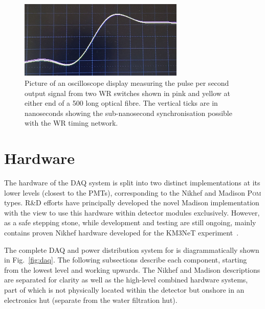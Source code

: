 \begin{figure} %
    \includegraphics[width=0.7\textwidth]{diagrams/5-daq/sync.pdf}
    \caption[Picture of White Rabbit timing synchronisation seen in \chips.]
    {Picture of an oscilloscope display measuring the pulse per second output signal from two WR
        switches shown in pink and yellow at either end of a \unit{500}{} long optical
        fibre. The vertical ticks are in nanoseconds showing the sub-nanosecond synchronisation
        possible with the WR timing network.}
    \label{fig:sync}
\end{figure}

\section{Hardware} %
\label{sec:daq_hard} %

The hardware of the \chipsfive DAQ system is split into two distinct implementations at its lower
levels (closest to the PMTs), corresponding to the Nikhef and Madison \textsc{Pom} types. \chips
R\&D efforts have principally developed the novel Madison implementation with the view to use this
hardware within detector modules exclusively. However, as a safe stepping stone, while development
and testing are still ongoing, \chipsfive mainly contains proven Nikhef hardware developed for the
KM3NeT experiment~\cite{adrian2016}.

The complete DAQ and power distribution system for \chipsfive is diagrammatically shown in
Fig.~\ref{fig:daq}. The following subsections describe each component, starting from the lowest
level and working upwards. The Nikhef and Madison descriptions are separated for clarity as well
as the high-level combined hardware systems, part of which is not physically located within the
detector but onshore in an electronics hut (separate from the water filtration hut).

